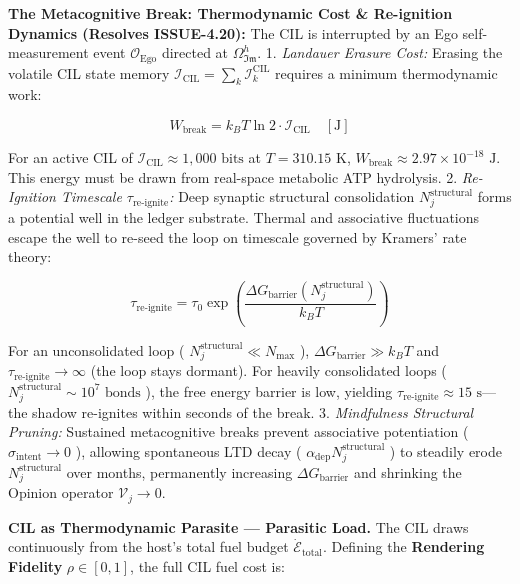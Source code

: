 \documentclass[11pt,a4paper]{article}
\theoremstyle{definition}
\theoremstyle{remark}
\begin{document}
\textbf{The Metacognitive Break: Thermodynamic Cost \& Re-ignition Dynamics (Resolves ISSUE-4.20):}
The CIL is interrupted by an Ego self-measurement event $\mathcal{O}_{\text{Ego}}$ directed at $\Omega_{\mathfrak{Im}}^h$.
1. \textit{Landauer Erasure Cost:} Erasing the volatile CIL state memory $\mathcal{I}_{\text{CIL}} = \sum_k \mathcal{I}_k^{\text{CIL}}$ requires a minimum thermodynamic work:


\begin{equation}
W_{\text{break}} = k_B T \ln 2 \cdot \mathcal{I}_{\text{CIL}} \quad [\text{J}]
\end{equation}


For an active CIL of $\mathcal{I}_{\text{CIL}} \approx 1{,}000\text{ bits}$ at $T = 310.15\text{ K}$, $W_{\text{break}} \approx 2.97 \times 10^{-18}\text{ J}$. This energy must be drawn from real-space metabolic ATP hydrolysis.
2. \textit{Re-Ignition Timescale $\tau_{\text{re-ignite}}$:} Deep synaptic structural consolidation $N_j^{\text{structural}}$ forms a potential well in the ledger substrate. Thermal and associative fluctuations escape the well to re-seed the loop on timescale governed by Kramers' rate theory:


\begin{equation}
\boxed{\tau_{\text{re-ignite}} = \tau_0 \exp\left(\frac{\Delta G_{\text{barrier}}\left(N_j^{\text{structural}}\right)}{k_B T}\right)}
\end{equation}


For an unconsolidated loop ( $N_j^{\text{structural}} \ll N_{\max}$ ), $\Delta G_{\text{barrier}} \gg k_B T$ and $\tau_{\text{re-ignite}} \to \infty$ (the loop stays dormant). For heavily consolidated loops ( $N_j^{\text{structural}} \sim 10^7\text{ bonds}$ ), the free energy barrier is low, yielding $\tau_{\text{re-ignite}} \approx 15\text{ s}$—the shadow re-ignites within seconds of the break.
3. \textit{Mindfulness Structural Pruning:} Sustained metacognitive breaks prevent associative potentiation ( $\sigma_{\text{intent}} \to 0$ ), allowing spontaneous LTD decay ( $\alpha_{\text{dep}} N_j^{\text{structural}}$ ) to steadily erode $N_j^{\text{structural}}$ over months, permanently increasing $\Delta G_{\text{barrier}}$ and shrinking the Opinion operator $\mathcal{V}_j \to 0$.

\textbf{CIL as Thermodynamic Parasite — Parasitic Load.} The CIL draws continuously from the host's total fuel budget $\dot{\mathcal{E}}_{\text{total}}$. Defining the \textbf{Rendering Fidelity} $\rho \in [0,1]$, the full CIL fuel cost is:
\end{document}
